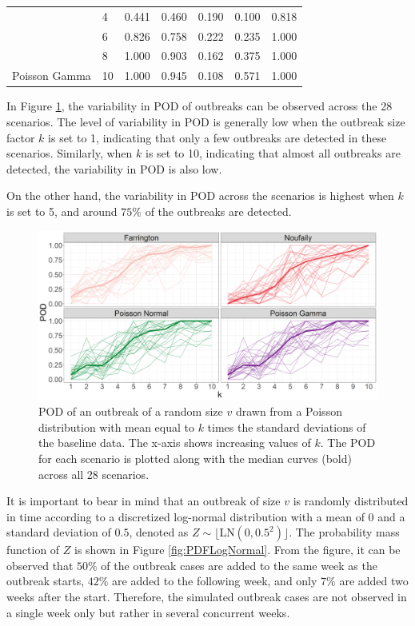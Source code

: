 \documentclass[preprint, 3p, authoryear]{elsarticle} %
\begin{document}
\begin{longtable}[t]{lllllll}
 & 4 & 0.441 & 0.460 & 0.190 & 0.100 & 0.818\\

 & 6 & 0.826 & 0.758 & 0.222 & 0.235 & 1.000\\

 & 8 & 1.000 & 0.903 & 0.162 & 0.375 & 1.000\\

\multirow{-5}{*}{\raggedright\arraybackslash Poisson Gamma} & 10 & 1.000 & 0.945 & 0.108 & 0.571 & 1.000\\*
\end{longtable}

In Figure \ref{fig:PropDetect}, the variability in POD of outbreaks can be observed across the 28 scenarios. The level of variability in POD is generally low when the outbreak size factor \(k\) is set to 1, indicating that only a few outbreaks are detected in these scenarios. Similarly, when \(k\) is set to 10, indicating that almost all outbreaks are detected, the variability in POD is also low.

On the other hand, the variability in POD across the scenarios is highest when \(k\) is set to 5, and around \(75\%\) of the outbreaks are detected.



\begin{figure}[H]
\includegraphics[width=1\linewidth]{../../figures/PropDetect} \caption{POD of an outbreak of a random size \(v\) drawn from a Poisson distribution with mean equal to \(k\) times the standard deviations of the baseline data. The x-axis shows increasing values of \(k\). The POD for each scenario is plotted along with the median curves (bold) across all 28 scenarios.}\label{fig:PropDetect}
\end{figure}

It is important to bear in mind that an outbreak of size \(v\) is randomly distributed in time according to a discretized log-normal distribution with a mean of \(0\) and a standard deviation of \(0.5\), denoted as \(Z \sim \lfloor \mathrm{LN}(0,0.5^2)\rfloor\). The probability mass function of \(Z\) is shown in Figure \ref{fig:PDFLogNormal}. From the figure, it can be observed that \(50\%\) of the outbreak cases are added to the same week as the outbreak starts, \(42\%\) are added to the following week, and only \(7\%\) are added two weeks after the start. Therefore, the simulated outbreak cases are not observed in a single week only but rather in several concurrent weeks.
\end{document}
